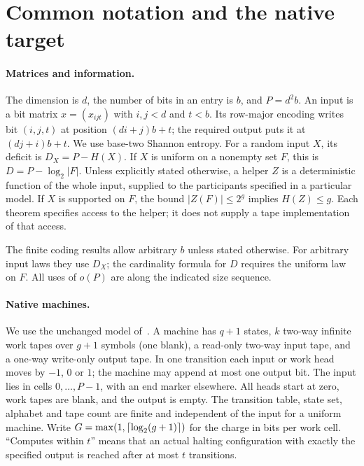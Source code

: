 \section{Common notation and the native target}\label{sec:model}

\paragraph{Matrices and information.}
The dimension is $d$, the number of bits in an entry is $b$, and
$P=d^2b$. An input is a bit matrix $x=(x_{ijt})$ with $i,j<d$ and $t<b$.
Its row-major encoding writes bit $(i,j,t)$ at position $(di+j)b+t$;
the required output puts it at $(dj+i)b+t$. We use base-two Shannon entropy.
For a random input $X$, its deficit is $D_X=P-H(X)$. If $X$ is uniform on a
nonempty set $F$, this is $D=P-\log_2|F|$. Unless explicitly stated otherwise,
a helper $Z$ is a deterministic function of the whole input, supplied to the participants specified in a
particular model. If $X$ is supported on $F$, the bound $|Z(F)|\le2^g$
implies $H(Z)\le g$. Each theorem specifies access to the helper; it does
not supply a tape implementation of that access.

The finite coding results allow arbitrary $b$ unless stated otherwise.
For arbitrary input laws they use $D_X$; the cardinality formula for $D$
requires the uniform law on $F$. All uses of $o(P)$ are along the indicated
size sequence.

\paragraph{Native machines.}
We use the unchanged model of~\cite{FirstPaper2026}. A machine has $q+1$
states, $k$ two-way infinite work tapes over $g+1$ symbols (one blank), a
read-only two-way input tape, and a one-way write-only output tape. In one
transition each input or work head moves by $-1$, $0$ or $1$; the machine may append at most
one output bit. The input lies in cells $0,\ldots,P-1$, with an end marker
elsewhere. All heads start at zero, work tapes are blank, and the output is
empty. The transition table, state set, alphabet and tape count are finite
and independent of the input for a uniform machine. Write
$G=\max(1,\lceil\log_2(g+1)\rceil)$ for the charge in bits per work cell.
``Computes within $t$'' means that an actual halting configuration with exactly
the specified output is reached after at most $t$ transitions.

